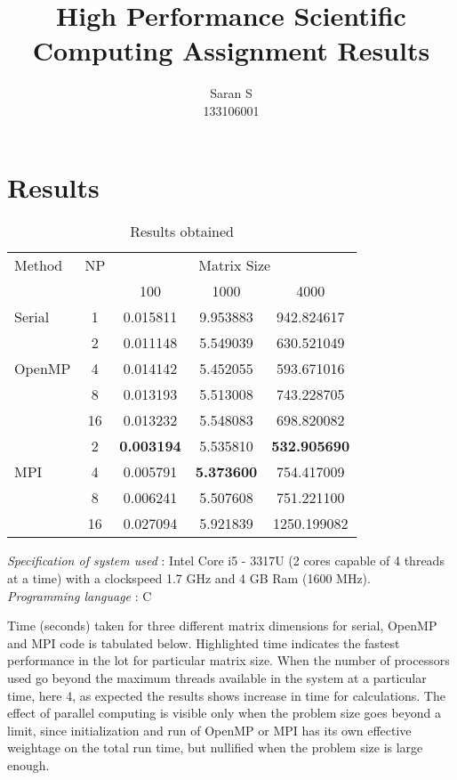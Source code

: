 \documentclass{report}
\title{High Performance Scientific Computing Assignment Results}
\author{Saran S \\ 133106001}
\begin{document}
\maketitle
\section*{Results}
\begin{table}[h]
\caption{Results obtained}
\centering
\begin{tabular}{lcccc}
\hline 
Method & NP & \multicolumn{3}{c}{Matrix Size} \\ %
       &    & 100      & 1000     & 4000 \\ %
\hline 
Serial & 1  & 0.015811 & 9.953883 & 942.824617 \\  \hline
       & 2  & 0.011148 & 5.549039 & 630.521049 \\
OpenMP & 4  & 0.014142 & 5.452055 & 593.671016 \\
       & 8  & 0.013193 & 5.513008 & 743.228705 \\
       & 16 & 0.013232 & 5.548083 & 698.820082 \\ \hline
       & 2  & \textbf{0.003194} & 5.535810 & \textbf{532.905690} \\
MPI & 4  & 0.005791 & \textbf{5.373600} & 754.417009 \\
       & 8  & 0.006241 & 5.507608 & 751.221100 \\
       & 16 & 0.027094 & 5.921839 & 1250.199082 \\ \hline
              

\end{tabular}
\end{table}
\begin{flushleft}
\textit{Specification of system used} : Intel Core i5 - 3317U (2 cores capable of 4 threads at a time) with a clockspeed 1.7 GHz and 4 GB Ram (1600 MHz).\\
\textit{Programming language} :  C
\end{flushleft}
Time (seconds) taken for three different matrix dimensions for serial, OpenMP and MPI code is tabulated below. Highlighted time indicates the fastest performance in the lot for particular matrix size. When the number of processors used go beyond the maximum threads  available in the system at a particular time, here 4, as expected the results shows increase in time for calculations. The effect of parallel computing is visible only when the problem size goes beyond a limit, since initialization and run of OpenMP or MPI has its own effective weightage on the total run time, but nullified when the problem size is large enough.    
\end{document}
